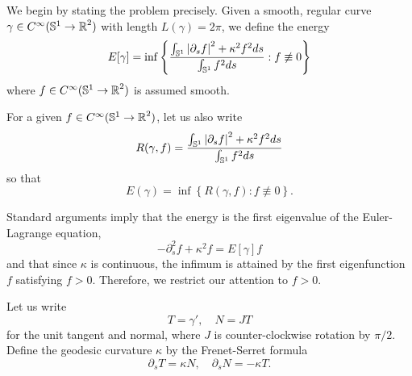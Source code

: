 \label{section two}

We begin by stating the problem precisely.    Given a smooth, regular curve \(\gamma \in C^{\infty}(\operatorname{\mathbb{S}^1} \to \operatorname{\mathbb{R}}^2)\) with length \(L(\gamma) = 2\pi\), we define the energy
\begin{equation}
\label{eq:Egamma}
E[\gamma] =%
 \inf\left\{\frac{\int_{\So} \abs{\partial_s f}^2 + \kappa^2 f^2 ds}{\int_{\So} f^2 ds} : f \not\equiv 0\right\}
\end{equation}
where \(f \in C^{\infty}(\operatorname{\mathbb{S}^1} \to \operatorname{\mathbb{R}}^2)\) is assumed smooth.

For a given \(f \in C^{\infty}(\operatorname{\mathbb{S}^1} \to \operatorname{\mathbb{R}}^2)\), let us also write
\begin{equation}
\label{eq:Egammaf}
R(\gamma, f) = \frac{\int_{\operatorname{\mathbb{S}^1}} \left|{\partial_s f}\right|^2 + \kappa^2 f^2 ds}{\int_{\operatorname{\mathbb{S}^1}} f^2 ds}
\end{equation}
so that
\begin{equation}
\label{eq:EgammaEgammaf}
E(\gamma) = \inf\left\{R(\gamma, f) : f \not\equiv 0\right\}.
\end{equation}

Standard arguments imply that the energy is the first eigenvalue of the Euler-Lagrange equation,
\begin{equation}
\label{eq:ELf}
-\partial_s^2 f + \kappa^2 f = E[\gamma]f
\end{equation}
and that since $\kappa$ is continuous, the infimum is attained by the first eigenfunction \(f\) satisfying \(f > 0\). Therefore, we restrict our attention to \(f > 0\).

Let us write
\begin{equation}
\label{eq:TN}
T = \gamma', \quad N = J T
\end{equation}
for the unit tangent and normal, where $J$ is counter-clockwise rotation by $\pi/2$. %
Define the geodesic curvature \(\kappa\) by the Frenet-Serret formula
\begin{equation}
\label{eq:FS}
\partial_s T =  \kappa N, \quad \partial_s N = -\kappa T.
\end{equation}

